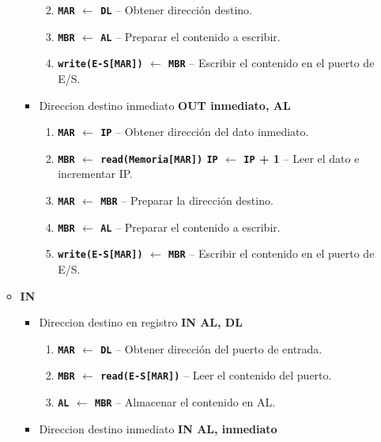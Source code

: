 \documentclass[12pt,oneside]{templates/unerthesis}
\providecommand{\tightlist}{%
  \setlength{\itemsep}{0pt}\setlength{\parskip}{0pt}}
\begin{document}
\begin{itemize}
\begin{itemize}
\begin{itemize}
      \begin{enumerate}
      \def\labelenumi{\arabic{enumi}.}
      \setcounter{enumi}{3}
      \tightlist
      \item
        \textbf{\texttt{MAR} \(\leftarrow\) \texttt{DL}} -- Obtener dirección destino.
      \item
        \textbf{\texttt{MBR} \(\leftarrow\) \texttt{AL}} -- Preparar el contenido a escribir.
      \item
        \textbf{\texttt{write(E-S{[}MAR{]})} \(\leftarrow\) \texttt{MBR}} -- Escribir el contenido en el puerto de E/S.
      \end{enumerate}
    \item
      Direccion destino inmediato \textbf{OUT inmediato, AL}

      \begin{enumerate}
      \def\labelenumi{\arabic{enumi}.}
      \setcounter{enumi}{3}
      \tightlist
      \item
        \textbf{\texttt{MAR} \(\leftarrow\) \texttt{IP}} -- Obtener dirección del dato inmediato.
      \item
        \textbf{\texttt{MBR} \(\leftarrow\) \texttt{read(Memoria{[}MAR{]})} \textbar{} \texttt{IP} \(\leftarrow\) \texttt{IP} + 1} -- Leer el dato e incrementar IP.
      \item
        \textbf{\texttt{MAR} \(\leftarrow\) \texttt{MBR}} -- Preparar la dirección destino.
      \item
        \textbf{\texttt{MBR} \(\leftarrow\) \texttt{AL}} -- Preparar el contenido a escribir.
      \item
        \textbf{\texttt{write(E-S{[}MAR{]})} \(\leftarrow\) \texttt{MBR}} -- Escribir el contenido en el puerto de E/S.
      \end{enumerate}
    \end{itemize}
  \item
    \textbf{IN}

    \begin{itemize}
    \tightlist
    \item
      Direccion destino en registro \textbf{IN AL, DL}

      \begin{enumerate}
      \def\labelenumi{\arabic{enumi}.}
      \setcounter{enumi}{3}
      \tightlist
      \item
        \textbf{\texttt{MAR} \(\leftarrow\) \texttt{DL}} -- Obtener dirección del puerto de entrada.
      \item
        \textbf{\texttt{MBR} \(\leftarrow\) \texttt{read(E-S{[}MAR{]})}} -- Leer el contenido del puerto.
      \item
        \textbf{\texttt{AL} \(\leftarrow\) \texttt{MBR}} -- Almacenar el contenido en AL.
      \end{enumerate}
    \item
      Direccion destino inmediato \textbf{IN AL, inmediato}


\end{itemize}
\end{itemize}
\end{itemize}
\end{document}
